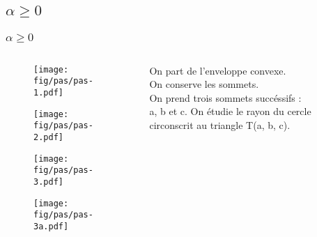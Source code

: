 \documentclass{beamer}
\begin{document}
\subsection{$\alpha \geq 0$}
\begin{frame}
\frametitle{$\alpha \geq 0$}
  \begin{columns}[t]
    \begin{column}{7cm}
      {
        \begin{figure}[h!]
          \centering
          \texttt{[image: fig/pas/pas-1.pdf]}
        \end{figure}
      }
      {
        \begin{figure}[h!]
          \centering
          \texttt{[image: fig/pas/pas-2.pdf]}
        \end{figure}
      }
      {
        \begin{figure}[h!]
          \centering
          \texttt{[image: fig/pas/pas-3.pdf]}
        \end{figure}
      }
      {
        \begin{figure}[h!]
          \centering
          \texttt{[image: fig/pas/pas-3a.pdf]}
        \end{figure}
      }      
    \end{column}
    \begin{column}{3cm}
      \begin{block}{}
        {
          On part de l'enveloppe convexe.\\
        }
        {
          On conserve les sommets.\\
        }
        {
          On prend trois sommets succéssifs :\\
          a, b et c.
        }
        {
          On étudie le rayon du cercle circonscrit au triangle T(a, b, c).\\

        }
      \end{block}  
    \end{column}
  \end{columns}

\end{frame}
\end{document}
